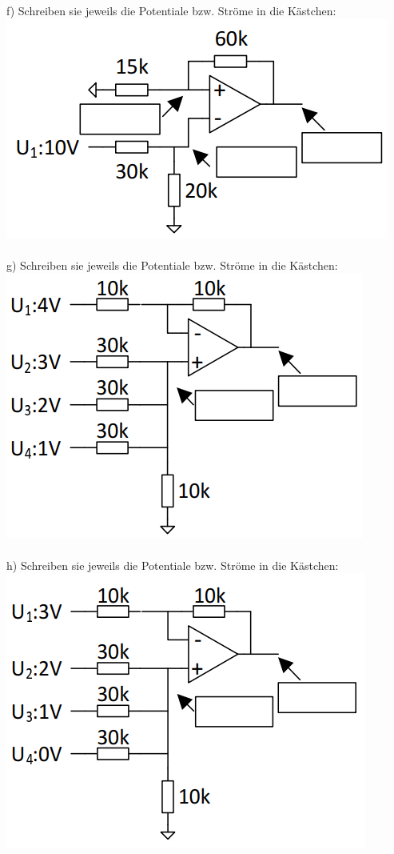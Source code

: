 \documentclass[A4]{scrartcl}
\begin{document}
  f) Schreiben sie jeweils die Potentiale bzw. Ströme in die Kästchen:\\
  \includegraphics{Schaltung11.png}\\\\
  g) Schreiben sie jeweils die Potentiale bzw. Ströme in die Kästchen:\\
  \includegraphics{Schaltung12.png}\\\\
  h) Schreiben sie jeweils die Potentiale bzw. Ströme in die Kästchen:\\
  \includegraphics{Schaltung13.png}\\\\
\end{document}
